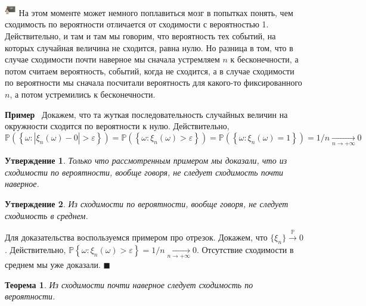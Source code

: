 \documentclass[12pt]{article}
\newtheorem{Th}{Теорема}
\newtheorem{St}{Утверждение}
\newenvironment{Proof}{\par\noindent{\bf Доказательство}}{$\blacksquare$}
\newenvironment{Ex}{{\bf Пример}\ }{}
\newenvironment{Wtf}{\includegraphics[height=5mm]{ping}}{}
\numberwithin{Th}{section}
\numberwithin{Def}{section}
\numberwithin{Lem}{section}
\numberwithin{St}{section}
\numberwithin{equation}{section}
\newcommand\Set[2]{\left\{ #1 \colon #2 \right\}}
\newcommand\Pro{\mathbb{P}} %
\begin{document}
\begin{Wtf}
На этом моменте может немного поплавиться мозг в попытках понять, чем сходимость по вероятности отличается от сходимости с вероятностью 1. Действительно, и там и там мы говорим, что вероятность тех событий, на которых случайная величина не сходится, равна нулю. Но разница в том, что в случае сходимости почти наверное мы сначала устремляем $n$ к бесконечности, а потом считаем вероятность, событий, когда не сходится, а в случае сходимости по вероятности мы сначала посчитали вероятность для какого-то фиксированного $n$, а потом устремились к бесконечности. 
\end{Wtf}

\begin{Ex}
Докажем, что та жуткая последовательность случайных величин на окружности сходится по вероятности к нулю. Действительно, 
$$\Pro(\Set{\omega}{|\xi_n(\omega) - 0| > \varepsilon}) = \Pro(\Set{\omega}{\xi_n(\omega) > \varepsilon}) = \Pro(\Set{\omega}{\xi_n(\omega) = 1}) = 1/n \xrightarrow[n \rightarrow +\infty]{} 0$$
\end{Ex}

\begin{St}
Только что рассмотренным примером мы доказали, что из сходимости по вероятности, вообще говоря, не следует сходимость почти наверное.
\end{St}

\begin{St}
Из сходимости по вероятности, вообще говоря, не следует сходимость в среднем.
\end{St}

\begin{Proof}
Для доказательства воспользуемся примером про отрезок. Докажем, что $\{\xi_n\} \xrightarrow{\Pro} 0$. Действительно, $\Pro{\Set{\omega}{\xi_n(\omega) > \varepsilon}} = 1/n \xrightarrow[n \rightarrow +\infty]{} 0$. Отсутствие сходимости в среднем мы уже доказали.
\end{Proof}

\begin{Th}
Из сходимости почти наверное следует сходимость по вероятности.
\end{Th}
\end{document}
